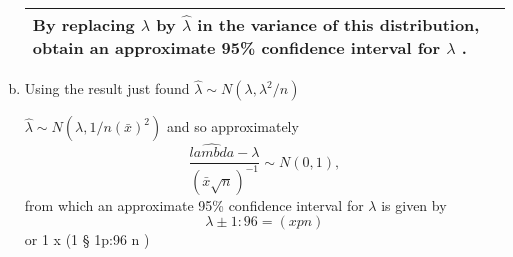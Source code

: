 \documentclass[a4paper,12pt]{article}
\begin{document}
\begin{enumerate}[(a)]
\begin{table}[ht!]
\begin{tabular}{|p{15cm}|}
  By replacing $\lambda$ by $\hat{\lambda}$  in the variance of this distribution, obtain an approximate 95\% confidence interval for $\lambda$ . 
  
\\ \hline 
   \end{tabular}
 \end{table}
\item  Using the result just found 
$\hat{\lambda} \sim N(\lambda, \lambda^2/n)$


$\hat{\lambda} \sim N(\lambda, 1/n(\bar{x})^2)$
 and so approximately
\[ \frac{\hat{lambda} - \lambda }{ (\bar{x} \sqrt{n})^{-1} } \sim N(0,1), \] from which an approximate 95\% confidence interval for $\lambda$ is given by
\[\lambda \pm 1:96=(x
p
n)\] or 1
x (1 § 1p:96
n )
\end{enumerate}
\end{document}
